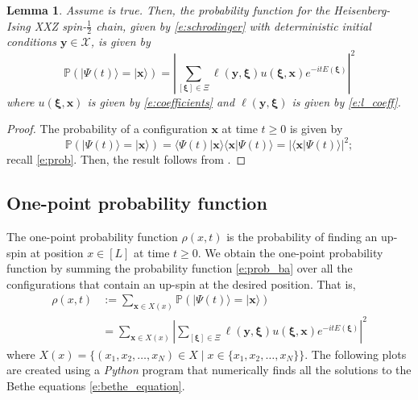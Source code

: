 \documentclass[a4paper,11pt]{article}
\newtheorem{lemma}[theorem]{Lemma}
\theoremstyle{definition}
\begin{document}
\begin{lemma}
Assume  is true. Then, the probability function for the Heisenberg-Ising XXZ spin-$\tfrac{1}{2}$ chain, given by \eqref{e:schrodinger} with deterministic initial conditions $\mathbf{y} \in \mathcal{X}$, is given by 
\begin{equation}\label{e:prob_ba}
    \mathbb{P}\left(| \Psi(t) \rangle = | \mathbf{x} \rangle\right) = \left|\sum_{[\boldsymbol{\xi}] \in \Xi} \ell(\mathbf{y}, \boldsymbol{\xi})u(\boldsymbol{\xi},\mathbf{x}) e^{-i t E(\boldsymbol{\xi})} \right|^2
\end{equation}
where $u(\boldsymbol{\xi}, \mathbf{x})$ is given by \eqref{e:coefficients} and $\ell(\mathbf{y}, \boldsymbol{\xi})$ is given by \eqref{e:l_coeff}.
\end{lemma}

\begin{proof}
The probability of a configuration $\mathbf{x}$ at time $t \geq 0$ is given by
\begin{equation}
    \mathbb{P}\left(| \Psi(t) \rangle = | \mathbf{x}\rangle\right) = \langle \Psi(t)| \mathbf{x} \rangle \langle \mathbf{x} | \Psi(t) \rangle = \vert \langle \mathbf{x} | \Psi(t) \rangle  \vert^2;
\end{equation}
recall \eqref{e:prob}. Then, the result follows from .
\end{proof}

\subsection{One-point probability function}

The one-point probability function $\rho(x,t)$ is the probability of finding an up-spin at position $x \in [L]$ at time $t\geq 0$. We obtain the one-point probability function by summing the probability function \eqref{e:prob_ba} over all the configurations that contain an up-spin at the desired position. That is,
\begin{equation}\label{e:one-point}
\begin{split}
    \rho(x,t) &:= \sum_{\mathbf{x} \in X(x)} \mathbb{P}\left(| \Psi(t) \rangle = | \mathbf{x} \rangle\right)\\
    &= \sum_{\mathbf{x} \in X(x)} \left|\sum_{[\boldsymbol{\xi}] \in \Xi} \ell(\mathbf{y}, \boldsymbol{\xi})u(\boldsymbol{\xi},\mathbf{x}) e^{-i t E(\boldsymbol{\xi})} \right|^2
\end{split}
\end{equation}
where $X(x) = \{(x_1, x_2, \dots, x_N) \in X \mid x \in\{x_1, x_2, \dots, x_N\} \}$. The following plots are created using a \emph{Python} program that numerically finds all the solutions to the Bethe equations \eqref{e:bethe_equation}.
\end{document}
